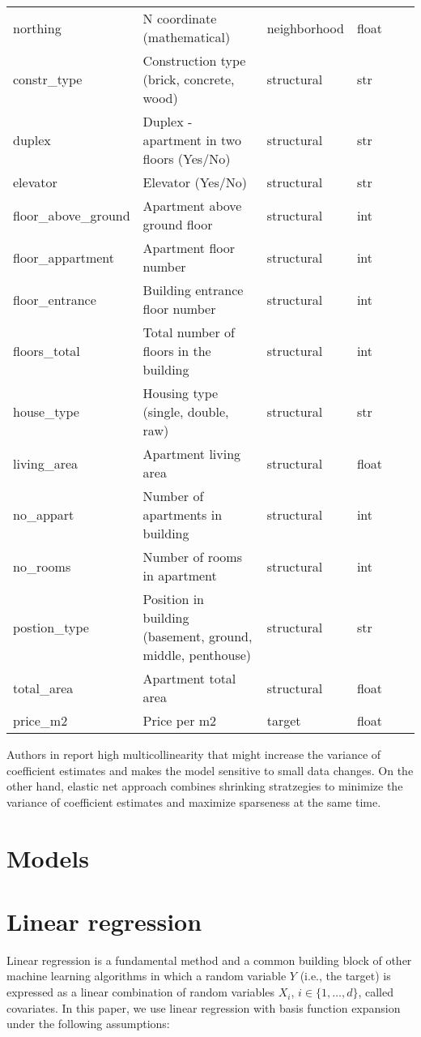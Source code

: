 \documentclass{article}
\begin{document}
\begin{table}[!ht]
\begin{longtable}{p{}p{}p{}p{}p{}p{}}
        northing & N coordinate (mathematical) & neighborhood & float \\
        constr\_type & Construction type (brick, concrete, wood) & structural & str \\
        duplex & Duplex - apartment in two floors (Yes/No) & structural & str \\
        elevator & Elevator (Yes/No) & structural & str \\
        floor\_above\_ground & Apartment above ground floor & structural & int \\
        floor\_appartment & Apartment floor number & structural & int \\
        floor\_entrance & Building entrance floor number & structural & int \\
        floors\_total & Total number of floors in the building & structural & int \\
        house\_type & Housing type (single, double, raw) & structural & str \\
        living\_area & Apartment living area & structural & float \\
        no\_appart & Number of apartments in building & structural & int \\
        no\_rooms & Number of rooms in apartment & structural & int \\
        postion\_type & Position in building (basement, ground, middle, penthouse) & structural & str \\
        total\_area & Apartment total area & structural & float \\
        price\_m2 & Price per m2 & target & float \\
       \bottomrule
     \end{longtable}
     \label{tab:table}
   \end{table}


   Authors in \cite{ceh_estimating_2018} report high multicollinearity that might increase the variance of coefficient estimates and makes the model sensitive to small data changes. On the other hand, elastic net approach combines shrinking stratzegies to minimize the variance of coefficient estimates and maximize sparseness at the same time.


\section{Models}
\section{Linear regression}
Linear regression is a fundamental method and a common building block of other machine learning algorithms in which a random variable $Y$ (i.e., the target) is expressed as a linear combination of random variables $X_i$, $i\in\{1,\ldots, d\}$, called covariates. In this paper, we use linear regression with basis function expansion under the following assumptions:
\end{document}
